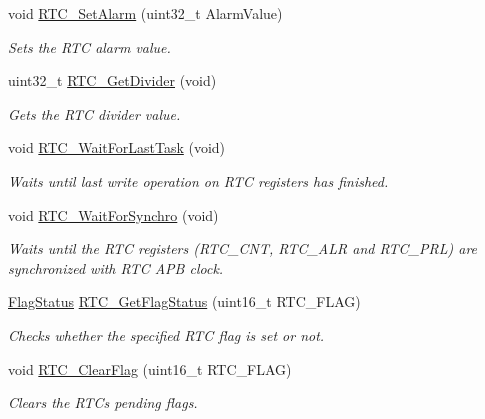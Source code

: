 \begin{DoxyCompactItemize}
void \hyperlink{group___r_t_c___exported___functions_gaec644c636a30ab5e287ba60ffc77132c}{R\+T\+C\+\_\+\+Set\+Alarm} (uint32\+\_\+t Alarm\+Value)
\begin{DoxyCompactList}\small\item\em Sets the R\+TC alarm value. \end{DoxyCompactList}\item 
uint32\+\_\+t \hyperlink{group___r_t_c___exported___functions_gaa4f00e0469fedcf6cbf23760e6d801ed}{R\+T\+C\+\_\+\+Get\+Divider} (void)
\begin{DoxyCompactList}\small\item\em Gets the R\+TC divider value. \end{DoxyCompactList}\item 
void \hyperlink{group___r_t_c___exported___functions_gaa0a406ef860d5231748c5f0d82673036}{R\+T\+C\+\_\+\+Wait\+For\+Last\+Task} (void)
\begin{DoxyCompactList}\small\item\em Waits until last write operation on R\+TC registers has finished. \end{DoxyCompactList}\item 
void \hyperlink{group___r_t_c___exported___functions_gaca4346e0dc15dccc15179786b28450db}{R\+T\+C\+\_\+\+Wait\+For\+Synchro} (void)
\begin{DoxyCompactList}\small\item\em Waits until the R\+TC registers (R\+T\+C\+\_\+\+C\+NT, R\+T\+C\+\_\+\+A\+LR and R\+T\+C\+\_\+\+P\+RL) are synchronized with R\+TC A\+PB clock. \end{DoxyCompactList}\item 
\hyperlink{group___exported__types_ga89136caac2e14c55151f527ac02daaff}{Flag\+Status} \hyperlink{group___r_t_c___exported___functions_ga21a85e5f846cb4552d5e76420779f3f6}{R\+T\+C\+\_\+\+Get\+Flag\+Status} (uint16\+\_\+t R\+T\+C\+\_\+\+F\+L\+AG)
\begin{DoxyCompactList}\small\item\em Checks whether the specified R\+TC flag is set or not. \end{DoxyCompactList}\item 
void \hyperlink{group___r_t_c___exported___functions_gacefb05730a77ffaa273c1ac3ade1a22f}{R\+T\+C\+\_\+\+Clear\+Flag} (uint16\+\_\+t R\+T\+C\+\_\+\+F\+L\+AG)
\begin{DoxyCompactList}\small\item\em Clears the R\+TC\textquotesingle{}s pending flags. \end{DoxyCompactList}\item 

\end{DoxyCompactItemize}
